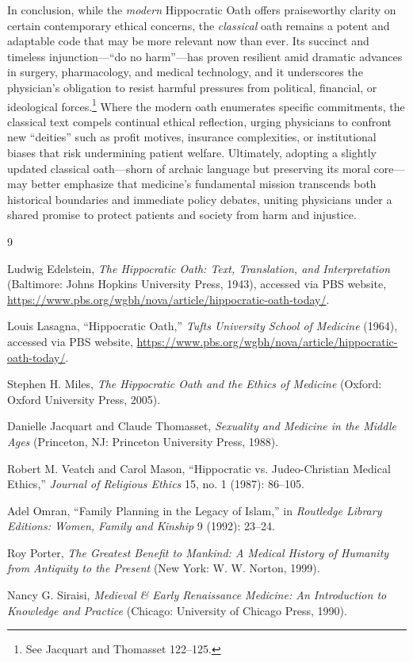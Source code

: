 \documentclass[12pt]{article}
\begin{document}
\bigskip

In conclusion, while the \textit{modern} Hippocratic Oath offers praiseworthy clarity on certain contemporary ethical concerns, the \textit{classical} oath remains a potent and adaptable code that may be more relevant now than ever. Its succinct and timeless injunction—“do no harm”—has proven resilient amid dramatic advances in surgery, pharmacology, and medical technology, and it underscores the physician’s obligation to resist harmful pressures from political, financial, or ideological forces.\footnote{See Jacquart and Thomasset 122--125.} Where the modern oath enumerates specific commitments, the classical text compels continual ethical reflection, urging physicians to confront new “deities” such as profit motives, insurance complexities, or institutional biases that risk undermining patient welfare. Ultimately, adopting a slightly updated classical oath—shorn of archaic language but preserving its moral core—may better emphasize that medicine’s fundamental mission transcends both historical boundaries and immediate policy debates, uniting physicians under a shared promise to protect patients and society from harm and injustice.

\bigskip

\begin{thebibliography}{9}

Ludwig Edelstein, \textit{The Hippocratic Oath: Text, Translation, and Interpretation} (Baltimore: Johns Hopkins University Press, 1943), accessed via PBS website, \url{https://www.pbs.org/wgbh/nova/article/hippocratic-oath-today/}.

Louis Lasagna, “Hippocratic Oath,” \textit{Tufts University School of Medicine} (1964), accessed via PBS website, \url{https://www.pbs.org/wgbh/nova/article/hippocratic-oath-today/}.

Stephen H. Miles, \textit{The Hippocratic Oath and the Ethics of Medicine} (Oxford: Oxford University Press, 2005).

Danielle Jacquart and Claude Thomasset, \textit{Sexuality and Medicine in the Middle Ages} (Princeton, NJ: Princeton University Press, 1988).

Robert M. Veatch and Carol Mason, “Hippocratic vs. Judeo-Christian Medical Ethics,” \textit{Journal of Religious Ethics} 15, no. 1 (1987): 86–105.

Adel Omran, “Family Planning in the Legacy of Islam,” in \textit{Routledge Library Editions: Women, Family and Kinship} 9 (1992): 23–24.

Roy Porter, \textit{The Greatest Benefit to Mankind: A Medical History of Humanity from Antiquity to the Present} (New York: W. W. Norton, 1999).

Nancy G. Siraisi, \textit{Medieval \& Early Renaissance Medicine: An Introduction to Knowledge and Practice} (Chicago: University of Chicago Press, 1990).

\end{thebibliography}
\end{document}
